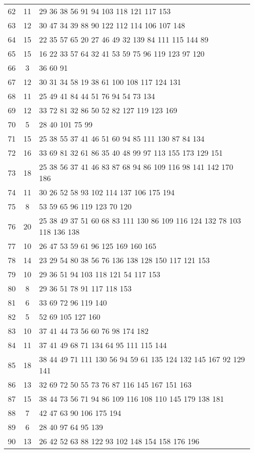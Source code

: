 \documentclass{standalone}
\begin{document}
\begin{tabular}{c c l}
62 & 11 & 29 36 38 56 91 94 103 118 121 117 153 \\
63 & 12 & 30 47 34 39 88 90 122 112 114 106 107 148 \\
64 & 15 & 22 35 57 65 20 27 46 49 32 139 84 111 115 144 89 \\
65 & 15 & 16 22 33 57 64 32 41 53 59 75 96 119 123 97 120 \\
66 & 3 & 36 60 91 \\
67 & 12 & 30 31 34 58 19 38 61 100 108 117 124 131 \\
68 & 11 & 25 49 41 84 44 51 76 94 54 73 134 \\
69 & 12 & 33 72 81 32 86 50 52 82 127 119 123 169 \\
70 & 5 & 28 40 101 75 99 \\
71 & 15 & 25 38 55 37 41 46 51 60 94 85 111 130 87 84 134 \\
72 & 16 & 33 69 81 32 61 86 35 40 48 99 97 113 155 173 129 151 \\
73 & 18 & 25 38 56 37 41 46 83 87 68 94 86 109 116 98 141 142 170 186 \\
74 & 11 & 30 26 52 58 93 102 114 137 106 175 194 \\
75 & 8 & 53 59 65 96 119 123 70 120 \\
76 & 20 & 25 38 49 37 51 60 68 83 111 130 86 109 116 124 132 78 103 118 136 138 \\
77 & 10 & 26 47 53 59 61 96 125 169 160 165 \\
78 & 14 & 23 29 54 80 38 56 76 136 138 128 150 117 121 153 \\
79 & 10 & 29 36 51 94 103 118 121 54 117 153 \\
80 & 8 & 29 36 51 78 91 117 118 153 \\
81 & 6 & 33 69 72 96 119 140 \\
82 & 5 & 52 69 105 127 160 \\
83 & 10 & 37 41 44 73 56 60 76 98 174 182 \\
84 & 11 & 37 41 49 68 71 134 64 95 111 115 144 \\
85 & 18 & 38 44 49 71 111 130 56 94 59 61 135 124 132 145 167 92 129 141 \\
86 & 13 & 32 69 72 50 55 73 76 87 116 145 167 151 163 \\
87 & 15 & 38 44 73 56 71 94 86 109 116 108 110 145 179 138 181 \\
88 & 7 & 42 47 63 90 106 175 194 \\
89 & 6 & 28 40 97 64 95 139 \\
90 & 13 & 26 42 52 63 88 122 93 102 148 154 158 176 196 \\

\end{tabular}
\end{document}

